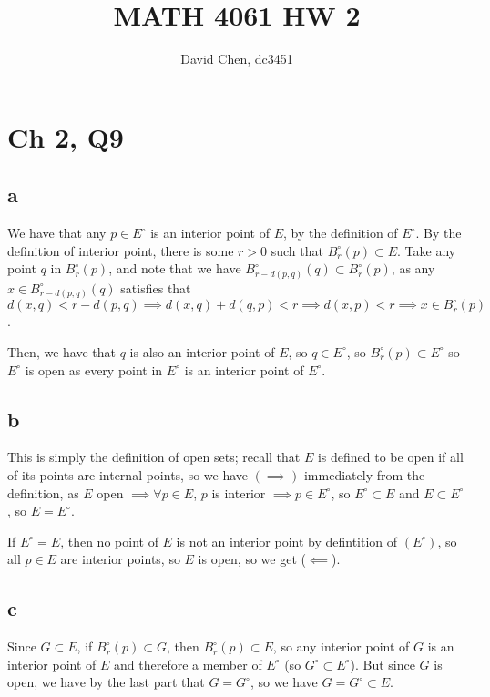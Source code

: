 \documentclass[12pt,letterpaper]{article}
\title{MATH 4061 HW 2}
\author{David Chen, dc3451}
\theoremstyle{definition}
\begin{document}
\maketitle

\section*{Ch 2, Q9}
\subsection*{a}

We have that any $p \in E^{\circ}$ is an interior point of $E$, by the definition of $E^{\circ}$. By the definition of interior point, there is some $r > 0$ such that $B_{r}^{\circ}(p) \subset E$. Take any point $q$ in $B_{r}^{\circ}(p)$, and note that we have $B_{r - d(p,q)}^{\circ}(q) \subset B_{r}^{\circ}(p)$, as any $x \in B_{r - d(p,q)}^{\circ}(q)$ satisfies that $d(x, q) < r - d(p,q) \implies d(x,q) + d(q,p) < r\implies d(x,p) < r \implies x \in B_{r}^{\circ}(p)$.

Then, we have that $q$ is also an interior point of $E$, so $q \in E^{\circ}$, so $B_{r}^{\circ}(p) \subset E^{\circ}$ so $E^{\circ}$ is open as every point in $E^{\circ}$ is an interior point of $E^{\circ}$.

\subsection*{b}

This is simply the definition of open sets; recall that $E$ is defined to be open if all of its points are internal points, so we have $(\implies)$ immediately from the definition, as $E$ open $\implies \forall p \in E$, $p$ is interior $\implies p \in E^{\circ}$, so $E^{\circ} \subset E$ and $E \subset E^{\circ}$, so $E = E^{\circ}$.

If $E^{\circ} = E$, then no point of $E$ is not an interior point by defintition of $(E^{\circ})$, so all $p \in E$ are interior points, so $E$ is open, so we get ($\impliedby$).

\subsection*{c}

Since $G \subset E$, if $B_{r}^{\circ}(p) \subset G$, then $B_{r}^{\circ}(p) \subset E$, so any interior point of $G$ is an interior point of $E$ and therefore a member of $E^{\circ}$ (so $G^{\circ} \subset E^{\circ}$). But since $G$ is open, we have by the last part that $G = G^{\circ}$, so we have $G = G^{\circ} \subset E$.
\end{document}
